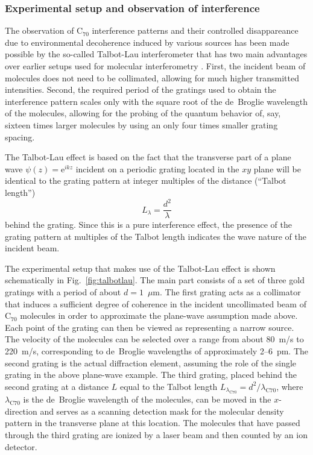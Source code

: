 \documentclass[12pt,aps,floatfix,amsmath,amssymb,showpacs,nofootinbib]{revtex4-2}
\newcommand{\be}{\begin{equation}} \newcommand{\ee}{\end{equation}}
\newcommand{\e}{\ensuremath{\mathrm{e}}}
\begin{document}
\subsubsection{Experimental setup and observation of interference}

The observation of C$_{70}$ interference patterns and their controlled
disappareance due to environmental decoherence induced by various
sources has been made possible by the so-called Talbot-Lau
interferometer \cite{Brezger:2002:mu} that has two main advantages
over earlier setups used for molecular interferometry
\cite{Borde:1994:om,Chapman:1995:bg}. First, the incident beam of
molecules does not need to be collimated, allowing for much higher
transmitted intensities.  Second, the required period of the gratings
used to obtain the interference pattern scales only with the square
root of the de~Broglie wavelength of the molecules, allowing for the
probing of the quantum behavior of, say, sixteen times larger
molecules by using an only four times smaller grating spacing.

The Talbot-Lau effect is based on the fact that the transverse part of
a plane wave $\psi(z) = \e^{ikz}$ incident on a periodic grating
located in the $xy$ plane will be identical to the grating pattern at
integer multiples of the distance (``Talbot length'')
%
\be
L_\lambda = \frac{d^2}{\lambda}
\ee
%
behind the grating. Since this is a pure interference effect, the
presence of the grating pattern at multiples of the Talbot length
indicates the wave nature of the incident beam.

The experimental setup that makes use of the Talbot-Lau effect is
shown schematically in Fig.~\ref{fig:talbotlau}. The main part
consists of a set of three gold gratings with a period of about
$d=1$~$\mu$m. The first grating acts as a collimator that induces a
sufficient degree of coherence in the incident uncollimated beam of
C$_{70}$ molecules in order to approximate the plane-wave assumption
made above. Each point of the grating can then be viewed as
representing a narrow source. The velocity of the molecules can be
selected over a range from about 80~m/s to 220~m/s, corresponding to
de~Broglie wavelengths of approximately 2--6~pm. The second grating is
the actual diffraction element, assuming the role of the single
grating in the above plane-wave example. The third grating, placed
behind the second grating at a distance $L$ equal to the Talbot length
$L_{\lambda_{\text{C}70}} = d^2/\lambda_{\text{C}70}$, where
$\lambda_{\text{C}70}$ is the de~Broglie wavelength of the molecules,
can be moved in the $x$-direction and serves as a scanning detection
mask for the molecular density pattern in the transverse plane at this
location.  The molecules that have passed through the third grating
are ionized by a laser beam and then counted by an ion detector.
\end{document}
